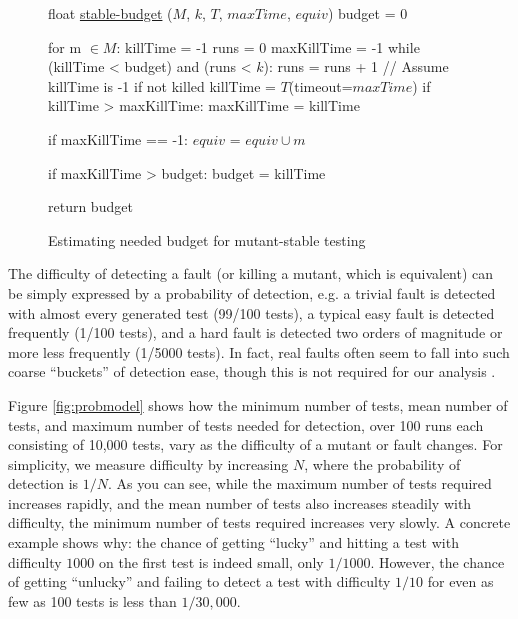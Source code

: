 \documentclass{svjour3}
\begin{document}
\begin{figure}
{%
\begin{code}
float {\underline{stable-budget}} ($M$, $k$, $T$, $maxTime$, $equiv$)
\vspace{0.1in}
  budget = 0

  for m $\in M$:
     killTime = -1
     runs = 0
     maxKillTime = -1
     while (killTime < budget) and (runs < $k$):
         runs = runs + 1
         // Assume killTime is -1 if not killed
         killTime = $T$(timeout=$maxTime$)
         if killTime > maxKillTime:
            maxKillTime = killTime

     if maxKillTime == -1:
        $equiv$ = $equiv \cup m$

     if maxKillTime > budget:
        budget = killTime
  
  return budget
\end{code}
}
\caption{Estimating needed budget for mutant-stable testing}
\label{alg:testdepth}
\end{figure}

The difficulty of detecting a fault (or killing a mutant, which is
equivalent) can be simply expressed by a probability of detection,
e.g. a trivial fault is detected with almost every generated test
(99/100 tests), a typical easy fault is detected frequently (1/100
tests), and a hard fault is detected two orders of magnitude or more
less frequently (1/5000 tests).  In fact, real faults often seem to
fall into such coarse ``buckets'' of detection ease, though this is not
required for our analysis \cite{PLDI13}.  

Figure \ref{fig:probmodel} shows how the minimum number of tests, mean
number of tests, and maximum number of tests needed for detection,
over 100 runs each consisting of 10,000 tests, vary as the difficulty
of a mutant or fault changes.  For simplicity, we measure difficulty
by increasing $N$, where the probability of detection is $1/N$.  As
you can see, while the maximum number of tests required increases
rapidly, and the mean number of tests also increases steadily with
difficulty, the minimum number of tests required increases very
slowly.  A concrete example shows why: the chance of getting ``lucky'' and hitting a test with
difficulty $1000$ on the first test is indeed small, only $1/1000$.  However, the
chance of getting ``unlucky'' and failing to detect a test with
difficulty $1/10$ for even as few as 100 tests is less than $1/30,000$.
\end{document}
